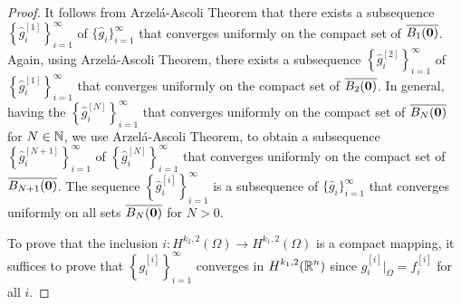\begin{proof}
It follows from Arzel\'a-Ascoli Theorem that there exists a subsequence
$\displaystyle \left\{ \hat{g}_i^{[1]}\right\}_{i=1}^\infty$ of
$\displaystyle \{\hat{g}_i\}_{i=1}^\infty$ that
converges uniformly on the compact set of $\overline{B_1(\mathbf{0})}$.  Again,
using Arzel\'a-Ascoli Theorem, there exists a subsequence
$\displaystyle \left\{ \hat{g}_{i}^{[2]}\right\}_{i=1}^\infty$ of
$\displaystyle \left\{ \hat{g}_i^{[1]}\right\}_{i=1}^\infty$ that
converges uniformly on the compact set of $\overline{B_2(\mathbf{0})}$.
In general,
having the $\displaystyle \left\{\hat{g}_i^{[N]}\right\}_{i=1}^\infty$
that converges uniformly on the compact set of
$\overline{B_N(\mathbf{0})}$ for $N \in \mathbb{N}$,
we use Arzel\'a-Ascoli Theorem, to obtain a subsequence
$\displaystyle \left\{ \hat{g}_i^{[N+1]}\right\}_{i=1}^\infty$ of
$\displaystyle \left\{\hat{g}_i^{[N]}\right\}_{i=1}^\infty$ that
converges uniformly on the compact set of $\overline{B_{N+1}(\mathbf{0})}$.
The sequence $\displaystyle \left\{ \hat{g}_i^{[i]}\right\}_{i=1}^\infty$ is a
subsequence of $\displaystyle \{\hat{g}_i\}_{i=1}^\infty$ that
converges uniformly on all sets $\overline{B_N(\mathbf{0})}$ for $N > 0$.

  To prove that the inclusion
$\displaystyle i:H^{k_2,2}(\Omega) \to H^{k_1,2}(\Omega)$ is a
compact mapping, it suffices to prove that
$\displaystyle \left\{g_i^{[i]}\right\}_{i=1}^\infty$ converges in
$\displaystyle H^{k_1,2}(\mathbb{R}^n)$ since
$\displaystyle g_i^{[i]}\big|_{\Omega} = f_i^{[i]}$ for all $i$.


\end{proof}
